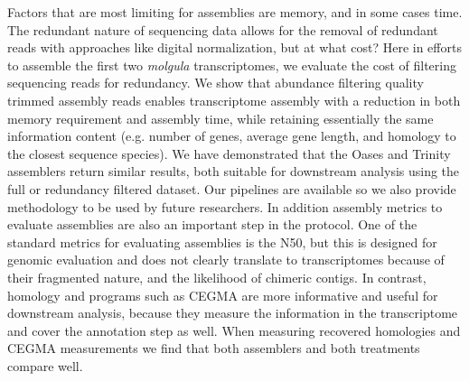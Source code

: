 Factors that are most limiting for assemblies are memory, and in some cases time. The redundant nature of sequencing data allows for the removal of redundant reads with approaches like digital normalization, but at what cost? Here in efforts to assemble the first two \textit{molgula} transcriptomes, we evaluate the cost of filtering sequencing reads for redundancy. We show that abundance filtering quality trimmed assembly reads enables transcriptome assembly with a reduction in both memory requirement and assembly time, while retaining essentially the same information content (e.g. number of genes, average gene length, and homology to the closest sequence species). We have demonstrated that the Oases and Trinity assemblers return similar results, both suitable for downstream analysis using the full or redundancy filtered dataset. Our pipelines are available so we also provide methodology to be used by future researchers. In addition assembly metrics to evaluate assemblies are also an important step in the protocol. One of the standard metrics for evaluating assemblies is the N50, but this is designed for genomic evaluation and does not clearly translate to transcriptomes because of their fragmented nature, and the likelihood of chimeric contigs.  In contrast, homology and programs such as CEGMA are more informative and useful for downstream analysis, because they measure the information in the transcriptome and cover the annotation step as well. When measuring recovered homologies and CEGMA measurements we find that both assemblers and both treatments compare well. %
 

